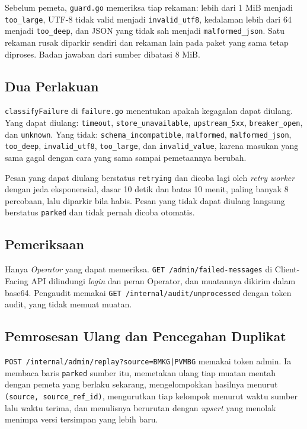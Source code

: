 Sebelum pemeta, \texttt{guard.go} memeriksa tiap rekaman: lebih dari 1 MiB menjadi \texttt{too\_large}, UTF-8 tidak valid menjadi \texttt{invalid\_utf8}, kedalaman lebih dari 64 menjadi \texttt{too\_deep}, dan JSON yang tidak sah menjadi \texttt{malformed\_json}. Satu rekaman rusak diparkir sendiri dan rekaman lain pada paket yang sama tetap diproses. Badan jawaban dari sumber dibatasi 8 MiB.

\subsection{Dua Perlakuan}

\texttt{classifyFailure} di \texttt{failure.go} menentukan apakah kegagalan dapat diulang. Yang dapat diulang: \texttt{timeout}, \texttt{store\_unavailable}, \texttt{upstream\_5xx}, \texttt{breaker\_open}, dan \texttt{unknown}. Yang tidak: \texttt{schema\_incompatible}, \texttt{malformed}, \texttt{malformed\_json}, \texttt{too\_deep}, \texttt{invalid\_utf8}, \texttt{too\_large}, dan \texttt{invalid\_value}, karena masukan yang sama gagal dengan cara yang sama sampai pemetaannya berubah.

Pesan yang dapat diulang berstatus \texttt{retrying} dan dicoba lagi oleh \textit{retry worker} dengan jeda eksponensial, dasar 10 detik dan batas 10 menit, paling banyak 8 percobaan, lalu diparkir bila habis. Pesan yang tidak dapat diulang langsung berstatus \texttt{parked} dan tidak pernah dicoba otomatis.

\subsection{Pemeriksaan}

Hanya \textit{Operator} yang dapat memeriksa. \texttt{GET /admin/failed-messages} di Client-Facing API dilindungi \textit{login} dan peran Operator, dan muatannya dikirim dalam base64. Pengaudit memakai \texttt{GET /internal/audit/unprocessed} dengan token audit, yang tidak memuat muatan.

\subsection{Pemrosesan Ulang dan Pencegahan Duplikat}

\texttt{POST /internal/admin/replay?source=BMKG|PVMBG} memakai token admin. Ia membaca baris \texttt{parked} sumber itu, memetakan ulang tiap muatan mentah dengan pemeta yang berlaku sekarang, mengelompokkan hasilnya menurut \texttt{(source, source\_ref\_id)}, mengurutkan tiap kelompok menurut waktu sumber lalu waktu terima, dan menulisnya berurutan dengan \textit{upsert} yang menolak menimpa versi tersimpan yang lebih baru.

